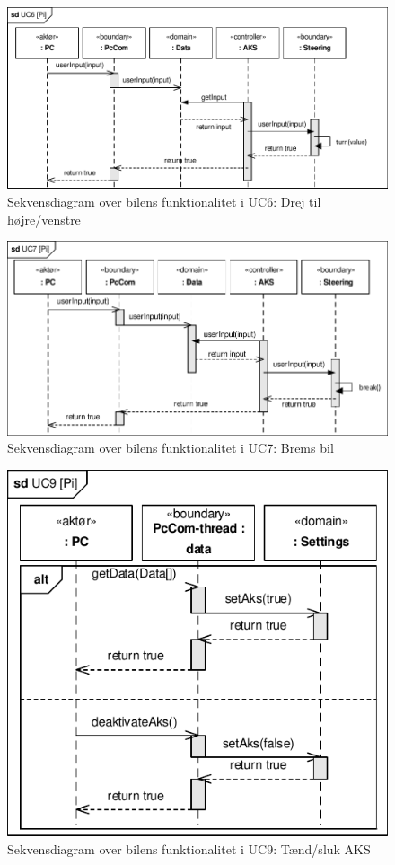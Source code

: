 \begin{figure}[h]
\centering
\includegraphics[]{../fig/diagrammer/bil/sd_uc6.pdf}
\caption{Sekvensdiagram over  bilens funktionalitet i UC6: Drej til højre/venstre}
\label{fig:sd_uc6_bil}
\end{figure}

\begin{figure}[h]
\centering
\includegraphics[]{../fig/diagrammer/bil/sd_uc7.pdf}
\caption{Sekvensdiagram over  bilens funktionalitet i UC7: Brems bil}
\label{fig:sd_uc7_bil}
\end{figure}

\begin{figure}[h]
\centering
\includegraphics[]{../fig/diagrammer/bil/sd_uc9.pdf}
\caption{Sekvensdiagram over  bilens funktionalitet i UC9: Tænd/sluk AKS}
\label{fig:sd_uc9_bil}
\end{figure}

